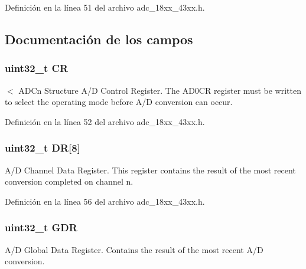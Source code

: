 Definición en la línea 51 del archivo adc\+\_\+18xx\+\_\+43xx.\+h.



\subsection{Documentación de los campos}
\subsubsection[{\texorpdfstring{CR}{CR}}]{ uint32\+\_\+t CR}\hypertarget{struct_l_p_c___a_d_c___t_ab40c89c59391aaa9d9a8ec011dd0907a}{}\label{struct_l_p_c___a_d_c___t_ab40c89c59391aaa9d9a8ec011dd0907a}
$<$ A\+D\+Cn Structure A/D Control Register. The A\+D0\+CR register must be written to select the operating mode before A/D conversion can occur. 

Definición en la línea 52 del archivo adc\+\_\+18xx\+\_\+43xx.\+h.

\subsubsection[{\texorpdfstring{DR}{DR}}]{ uint32\+\_\+t DR\mbox{[}8\mbox{]}}\hypertarget{struct_l_p_c___a_d_c___t_a4d79054afddcdbbfa9f690e452269d4e}{}\label{struct_l_p_c___a_d_c___t_a4d79054afddcdbbfa9f690e452269d4e}
A/D Channel Data Register. This register contains the result of the most recent conversion completed on channel n. 

Definición en la línea 56 del archivo adc\+\_\+18xx\+\_\+43xx.\+h.

\subsubsection[{\texorpdfstring{G\+DR}{GDR}}]{ uint32\+\_\+t G\+DR}\hypertarget{struct_l_p_c___a_d_c___t_a2272ff4c98c72be44cbb1f47f4bc3100}{}\label{struct_l_p_c___a_d_c___t_a2272ff4c98c72be44cbb1f47f4bc3100}
A/D Global Data Register. Contains the result of the most recent A/D conversion. 

